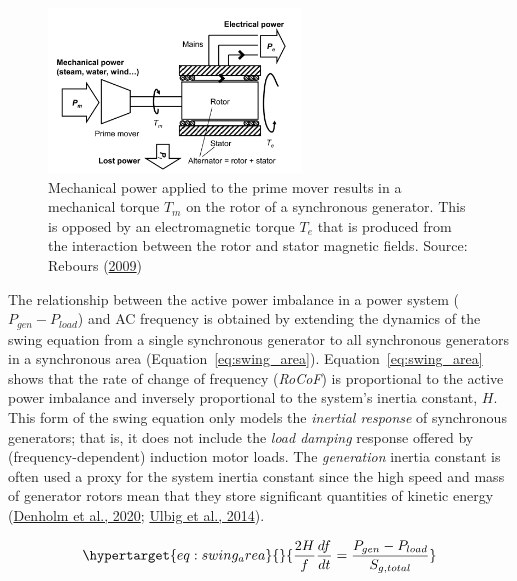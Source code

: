 \documentclass[12pt,a4paper,]{report}
\begin{document}
\begin{figure}
\hypertarget{fig:synch_torques}{%
\centering
\includegraphics[width=0.6\textwidth,height=\textheight]{source/figures/swing.png}
\caption[Mechanical and electromagnetic torques on a synchronous
generator]{Mechanical power applied to the prime mover results in a
mechanical torque \(T_m\) on the rotor of a synchronous generator. This
is opposed by an electromagnetic torque \(T_e\) that is produced from
the interaction between the rotor and stator magnetic fields. Source:
Rebours
(\protect\hyperlink{ref-reboursComprehensiveAssessmentMarkets2009}{2009})}\label{fig:synch_torques}
}
\end{figure}

The relationship between the active power imbalance in a power system
(\(P_{gen}-P_{load}\)) and AC frequency is obtained by extending the
dynamics of the swing equation from a single synchronous generator to
all synchronous generators in a synchronous area
(Equation~\ref{eq:swing_area}). Equation~\ref{eq:swing_area} shows that
the rate of change of frequency (\emph{RoCoF}) is proportional to the
active power imbalance and inversely proportional to the system's
inertia constant, \(H\). This form of the swing equation only models the
\emph{inertial response} of synchronous generators; that is, it does not
include the \emph{load damping} response offered by
(frequency-dependent) induction motor loads. The \emph{generation}
inertia constant is often used a proxy for the system inertia constant
since the high speed and mass of generator rotors mean that they store
significant quantities of kinetic energy
(\protect\hyperlink{ref-denholmInertiaPowerGrid2020}{Denholm et al.,
2020}; \protect\hyperlink{ref-ulbigImpactLowRotational2014}{Ulbig et
al., 2014}).

\begin{equation}\protect\hypertarget{eq:swing_area}{}{\frac{2H}{f}\frac{df}{dt} = \frac{P_{gen}-P_{load}}{S_{g, total}}}\label{eq:swing_area}\end{equation}
\end{document}
